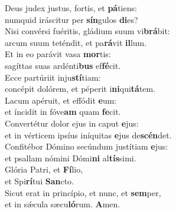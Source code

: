 \evenverse Deus judex justus, fortis, et \textbf{pá}tiens:~\*\\
\evenverse numquid iráscitur per \textbf{sín}gulos \textbf{di}es?\\
\oddverse Nisi convérsi fuéritis, gládium suum vi\textbf{brá}bit:~\*\\
\oddverse arcum suum teténdit, et pa\textbf{rá}vit \textbf{il}lum.\\
\evenverse Et in eo parávit vasa \textbf{mor}tis:~\*\\
\evenverse sagíttas suas ardénti\textbf{bus} ef\textbf{fé}cit.\\
\oddverse Ecce partúriit inju\textbf{stí}tiam:~\*\\
\oddverse concépit dolórem, et péperit i\textbf{ni}qui\textbf{tá}tem.\\
\evenverse Lacum apéruit, et effódit \textbf{e}um:~\*\\
\evenverse et íncidit in fóve\textbf{am} quam \textbf{fe}cit.\\
\oddverse Convertétur dolor ejus in caput \textbf{e}jus:~\*\\
\oddverse et in vérticem ipsíus iníquitas \textbf{e}jus de\textbf{scén}det.\\
\evenverse Confitébor Dómino secúndum justítiam \textbf{e}jus:~\*\\
\evenverse et psallam nómini Dómi\textbf{ni} al\textbf{tís}simi.\\
\oddverse Glória Patri, et \textbf{Fí}lio,~\*\\
\oddverse et Spi\textbf{rí}tui \textbf{San}cto.\\
\evenverse Sicut erat in princípio, et nunc, et \textbf{sem}per,~\*\\
\evenverse et in sǽcula sæcu\textbf{ló}rum. \textbf{A}men.\\
